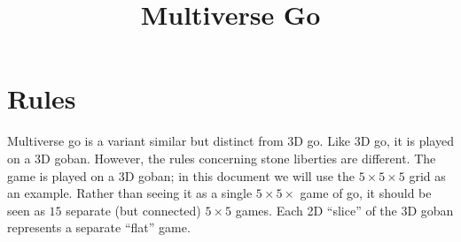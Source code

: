 \documentclass{article}
\title{Multiverse Go}
\date{}
\begin{document}
\maketitle

\newcommand\grid[1]{
  \pgfmathsetmacro\size{#1}
  \pgfmathsetmacro\sizemtwo{#1 - 2}

  \draw[ultra thick] (0,0) -- (0,\size - 1);
  \draw[ultra thick] (0,0) -- (\size - 1,0);
  \draw[ultra thick] (0,\size - 1) -- (\size - 1,\size - 1);
  \draw[ultra thick] (\size - 1,0) -- (\size - 1,\size - 1);

  \foreach \i in {1,...,\sizemtwo} {
    \draw (\i,0) -- (\i,\size - 1);
    \draw (0,\i) -- (\size - 1,\i);
  }
}

\newcommand\xlabels[2]{
  \foreach \label [count=\i] in #2 {
    \node at (\i-1,-0.5) {\texttt{\label}};
    \node at (\i-1,#1 -0.5) {\texttt{\label}};

    \ifnum \i=#1
      \breakforeach
    \fi
  }
}

\newcommand\ylabels[2]{
  \foreach \label [count=\i] in #2 {
    \node at (-0.5,\i-1) {\texttt{\label}};
    \node at (#1 -0.5,\i-1) {\texttt{\label}};

    \ifnum \i=#1
      \breakforeach
    \fi
  }
}

\newcommand\upperlabels{A,...,Z}
\newcommand\lowerlabels{a,...,z}
\newcommand\numberlabels{1,...,19}

\newcommand\upperboard[1]{
  \grid{#1}
  \xlabels{#1}{\numberlabels}
  \ylabels{#1}{\lowerlabels}
}

\newcommand\numberboard[1]{
  \grid{#1}
  \xlabels{#1}{\upperlabels}
  \ylabels{#1}{\lowerlabels}
}

\newcommand\lowerboard[1]{
  \grid{#1}
  \xlabels{#1}{\upperlabels}
  \ylabels{#1}{\numberlabels}
}

\section{Rules}

Multiverse go is a variant similar but distinct from 3D go.  Like 3D go, it is
played on a 3D goban.  However, the rules concerning stone liberties are
different.
%
The game is played on a 3D goban;  in this document we will use the $5\times
5\times 5$ grid as an example.  Rather than seeing it as a single $5 \times
5\times$ game of go, it should be seen as $15$ separate (but connected)
$5\times 5$ games.  Each 2D ``slice'' of the 3D goban represents a separate
``flat'' game.
\end{document}
